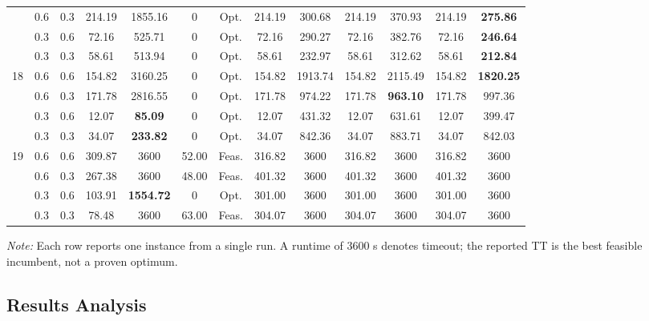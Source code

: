 \documentclass[letterpaper, 10 pt, conference]{ieeeconf}  %
\begin{document}
\begin{table}[htb]
{\begin{tabular}{@{} ccc ccc ccc cc cc @{}}
    & 0.6 & 0.3 & 214.19 & 1855.16 & 0 & Opt. & 214.19 & 300.68 & 214.19 & 370.93 & 214.19 & \textbf{275.86} \\
    & 0.3 & 0.6 & 72.16 & 525.71 & 0 & Opt. & 72.16 & 290.27 & 72.16 & 382.76 & 72.16 & \textbf{246.64} \\
    & 0.3 & 0.3 & 58.61 & 513.94 & 0 & Opt. & 58.61 & 232.97 & 58.61 & 312.62 & 58.61 & \textbf{212.84} \\
    \midrule
    \multirow{4}{*}{18} 
    & 0.6 & 0.6 & 154.82 & 3160.25 & 0 & Opt. & 154.82 & 1913.74 & 154.82 & 2115.49 & 154.82 & \textbf{1820.25} \\
    & 0.6 & 0.3 & 171.78 & 2816.55 & 0 & Opt. & 171.78 & 974.22 & 171.78 & \textbf{963.10} & 171.78 & 997.36 \\
    & 0.3 & 0.6 & 12.07 & \textbf{85.09} & 0 & Opt. & 12.07 & 431.32 & 12.07 & 631.61 & 12.07 & 399.47 \\
    & 0.3 & 0.3 & 34.07 & \textbf{233.82} & 0 & Opt. & 34.07 & 842.36 & 34.07 & 883.71 & 34.07 & 842.03 \\
    \midrule
    \multirow{4}{*}{19} 
    & 0.6 & 0.6 & 309.87 & 3600 & 52.00 & Feas. & 316.82 & 3600 & 316.82 & 3600& 316.82 & 3600 \\
    & 0.6 & 0.3 & 267.38 & 3600 & 48.00 & Feas. & 401.32 & 3600 & 401.32 & 3600 & 401.32 & 3600 \\
    & 0.3 & 0.6 & 103.91 & \textbf{1554.72} & 0 & Opt. & 301.00 & 3600 & 301.00 & 3600 & 301.00 & 3600 \\
    & 0.3 & 0.3 & 78.48 & 3600 & 63.00 & Feas. & 304.07 & 3600 & 304.07 & 3600 & 304.07 & 3600 \\
    \bottomrule
    \end{tabular}
  }
  
\vspace*{1.5mm} %
\noindent\begin{minipage}{\linewidth}
\footnotesize
\textit{Note:} Each row reports one instance from a single run. A runtime of 3600 s denotes timeout; the reported TT is the best feasible incumbent, not a proven optimum.
\end{minipage}
\vspace{-4mm}

\end{table}



\subsection{Results Analysis}
\end{document}
